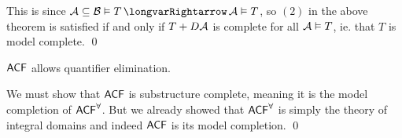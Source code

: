 \ecoro

This is since ${\cal A}\subseteq{\cal B}\vDash T\implies{\cal A}\vDash T$, so $(2)$ in the above theorem is satisfied if and only if $T+D{\cal A}$ is complete for all ${\cal A}\vDash T$, ie. that $T$ is
model complete.
\qed

\bthrm

    ${\sf ACF}$ allows quantifier elimination.

\ethrm

We must show that ${\sf ACF}$ is substructure complete, meaning it is the model completion of ${\sf ACF}^\forall$.
But we already showed that ${\sf ACF}^\forall$ is simply the theory of integral domains and indeed ${\sf ACF}$ is its model completion.
\qed

